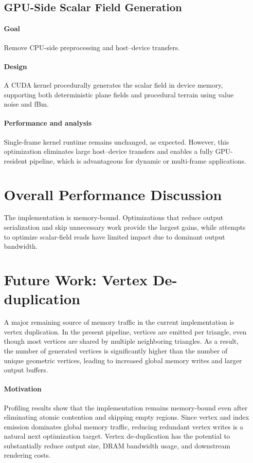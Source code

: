 \documentclass[11pt,a4paper]{article}
\begin{document}
\subsection{GPU-Side Scalar Field Generation}

\paragraph{Goal}
Remove CPU-side preprocessing and host--device transfers.

\paragraph{Design}
A CUDA kernel procedurally generates the scalar field in device memory, supporting both deterministic plane fields and procedural terrain using value noise and fBm.

\paragraph{Performance and analysis}
Single-frame kernel runtime remains unchanged, as expected. However, this optimization eliminates large host--device transfers and enables a fully GPU-resident pipeline, which is advantageous for dynamic or multi-frame applications.


\section{Overall Performance Discussion}

The implementation is memory-bound. Optimizations that reduce
output serialization and skip unnecessary work provide the largest gains, while attempts to optimize scalar-field reads have limited impact due to dominant output bandwidth.

\section{Future Work: Vertex De-duplication}

A major remaining source of memory traffic in the current implementation is
vertex duplication. In the present pipeline, vertices are emitted per triangle,
even though most vertices are shared by multiple neighboring triangles. As a
result, the number of generated vertices is significantly higher than the number
of unique geometric vertices, leading to increased global memory writes and
larger output buffers.

\paragraph{Motivation}
Profiling results show that the implementation remains memory-bound even after eliminating atomic contention and skipping empty regions. Since vertex and index emission dominates global memory traffic, reducing redundant vertex writes is a
natural next optimization target. Vertex de-duplication has the potential to substantially reduce output size, DRAM bandwidth usage, and downstream rendering costs.
\end{document}
